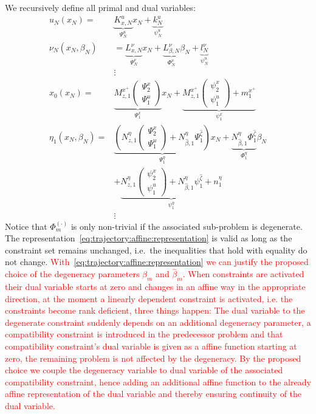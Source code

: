 \documentclass{ifacconf}
\begin{document}
We recursively define all primal and dual variables:
\begin{equation}\label{eq:trajectory:affine:representation}
	\begin{split}
		u_N(x_N) =& \underbrace{K_{x,N}^u}_{\Psi_N^u} x_N + \underbrace{k_N^u}_{\psi_N^u}\\
		\nu_N(x_N,\beta_N) &= \underbrace{L_{x,N}^\nu}_{\Psi_N^\nu} x_N + \underbrace{L_{\beta,N}^\nu}_{\Phi_N^\nu} \beta_N + 
		\underbrace{l_N^\nu}_{\psi_N^u}\\
		&\vdots \\
		x_0(x_N) =& \underbrace{M_{z,1}^{x^+}\left(\begin{array}{c} \Psi_2^x \\ \Psi_1^u \end{array}\right)}_{\Psi_1^x}x_N + 
		\underbrace{M_{z,1}^{x^+}\left(\begin{array}{c} \psi_2^x \\ \psi_1^u \end{array}\right) + m_1^{x^+}}_{\psi^x_1}\\
		\eta_1(x_N,\beta_N) =& \underbrace{\left(N_{z,1}^{\eta}\left(\begin{array}{c} \Psi_2^x \\ \Psi_1^u \end{array}\right) + 
		N_{\hat\beta,1}^\eta \Psi_1^{\hat\zeta}\right)}_{\Psi_1^\eta}x_N + \underbrace{N_{\hat\beta,1}^\eta \Phi_1^{\hat\zeta}}_{\Phi_1^\eta} \beta_N\\
		&+\underbrace{N_{z,1}^{\eta}\left(\begin{array}{c} \psi_2^x \\ \psi_1^u \end{array}\right) + 
		N_{\hat\beta,1}^\eta \psi_1^{\hat\zeta} + n_1^\eta}_{\psi_1^\eta}\\
		&\vdots
	\end{split}
\end{equation}
Notice that $\Phi^{(\cdot)}_m$ is only non-trivial if the associated sub-problem is degenerate. The
representation~\eqref{eq:trajectory:affine:representation} is valid as long as the constraint set remains
unchanged, i.e.\ the inequalities that hold with equality do not change.
\textcolor{red}{With~\eqref{eq:trajectory:affine:representation} we can justify the proposed choice of the degeneracy parameters
$\beta_m$ and $\hat\beta_m$. When constraints are activated their dual variable starts at zero and changes
in an affine way in the appropriate direction, at the moment a linearly dependent constraint is activated, i.e. the
constraints become rank deficient, three things happen: The dual variable to the degenerate constraint suddenly
depends on an additional degeneracy parameter, a compatibility constraint is introduced in the predecessor
problem and that compatibility constraint's dual variable is given as a affine function starting at zero,
the remaining problem is not affected by the degeneracy. By the proposed choice we couple
the degeneracy variable to dual variable of the associated compatibility constraint, hence adding an 
additional affine function to the already affine representation of the dual variable and thereby ensuring continuity
of the dual variable.}
\end{document}
